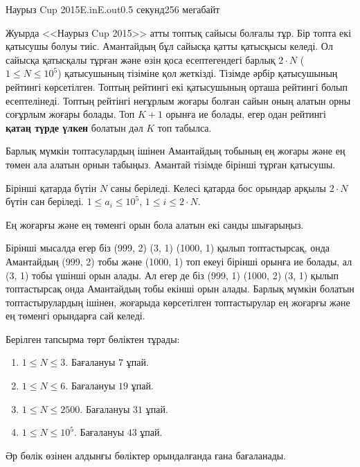 \begin{problem}{Наурыз Cup 2015}{E.in}{E.out}{0.5 секунд}{256 мегабайт}

Жуырда <<Наурыз Cup 2015>>  атты топтық сайысы болғалы тұр. Бір топта екі қатысушы болуы тиіс. Амантайдың бұл сайысқа қатты қатысқысы келеді. Ол сайысқа қатысқалы тұрған және өзін қоса есептегендегі барлық $2 \cdot N$ ($1 \le N \le 10^5$) қатысушының тізіміне қол жеткізді. Тізімде әрбір қатысушының рейтингі көрсетілген. Топтың рейтингі екі қатысушының орташа рейтингі болып есептелінеді. Топтың рейтінгі неғұрлым жоғары болған сайын оның алатын орны соғұрлым жоғары болады. Топ $K+1$ орынға ие болады, егер одан рейтингі \textbf{қатаң түрде үлкен} болатын дәл $K$ топ табылса. 

Барлық мүмкін топтасулардың ішінен Амантайдың тобының ең жоғары және ең төмен ала алатын орнын табыңыз. Амантай тізімде бірінші тұрған қатысушы. 

\InputFile
Бірінші қатарда бүтін $N$ саны беріледі. Келесі қатарда бос орындар арқылы $2 \cdot N$ бүтін сан беріледі. $1 \le a_i \le 10^5$, $1 \le i \le 2 \cdot N$.

\OutputFile
Ең жоғарғы және ең төменгі орын бола алатын екі санды шығарыңыз.

\Examples

\begin{example}
%
%
%
\end{example}


Бірінші мысалда егер біз (999, 2) (3, 1) (1000, 1) қылып топтастырсақ, онда Амантайдың (999, 2) тобы  және (1000, 1) топ екеуі бірінші орынға ие болады, ал (3, 1) тобы үшінші орын алады. Ал егер де біз (999, 1) (1000, 2) (3, 1) қылып топтастырсақ онда Амантайдың тобы екінші орын алады. Барлық мүмкін болатын топтастырулардың ішінен, жоғарыда көрсетілген топтастырулар ең жоғарғы және ең төменгі орындарға сай келеді.

\Scoring
Берілген тапсырма төрт бөліктен тұрады:
\begin{enumerate}
\item $1 \le N \le 3$. Бағалануы $7$ ұпай.
\item $1 \le N \le 6$. Бағалануы $19$ ұпай.
\item $1 \le N \le 2500$. Бағалануы $31$ ұпай.
\item $1 \le N \le 10^5$. Бағалануы $43$ ұпай.
\end{enumerate}

Әр бөлік өзінен алдынғы бөліктер орындалғанда ғана бағаланады.

\end{problem}
